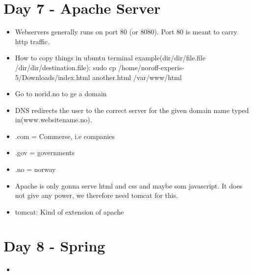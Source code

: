 \documentclass[]{article}
\begin{document}
\section{Day 7 - Apache Server}
\begin{itemize}
	\item Webservers generally runs on port 80 (or 8080). Port 80 is meant to carry http traffic.
	\item How to copy things in ubuntu terminal example(dir/dir/file.file /dir/dir/destination.file): sudo cp /home/noroff-experis-5/Downloads/index.html another.html /var/www/html
	\item Go to norid.no to ge a domain
	\item DNS redirects the user to the correct server for the given domain name typed in(www.websitename.no).
	\item .com = Commerse, i.e companies
	\item .gov = governments
	\item .no = norway 
	\item Apache is only gonna serve html and css and maybe som javascript. It does not give any power, we therefore need tomcat for this.
	\item tomcat: Kind of extension of apache
\end{itemize}

\section{Day 8 - Spring}
\begin{itemize}
	\item 
\end{itemize}
\end{document}
